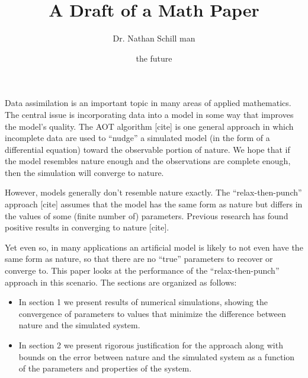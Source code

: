 \documentclass[12pt]{article}
\title{A Draft of a Math Paper}
\author{Dr. Nathan Schill man}
\date{the future}
\begin{document}
\maketitle

Data assimilation is an important topic in many areas of applied mathematics.
The central issue is incorporating data into a model in some way that improves the model's quality.
The AOT algorithm [cite] is one general approach in which incomplete data are used to ``nudge'' a simulated model (in the form of a differential equation) toward the observable portion of nature.
We hope that if the model resembles nature enough and the observations are complete enough, then the simulation will converge to nature.

However, models generally don't resemble nature exactly.
The ``relax-then-punch'' approach [cite] assumes that the model has the same form as nature but differs in the values of some (finite number of) parameters.
Previous research has found positive results in converging to nature [cite].

Yet even so, in many applications an artificial model is likely to not even have the same form as nature, so that there are no ``true'' parameters to recover or converge to.
This paper looks at the performance of the ``relax-then-punch'' approach in this scenario.
The sections are organized as follows:
\begin{itemize}
    \item In section 1 we present results of numerical simulations, showing the convergence of parameters to values that minimize the difference between nature and the simulated system.
    \item In section 2 we present rigorous justification for the approach along with bounds on the error between nature and the simulated system as a function of the parameters and properties of the system.
\end{itemize}
\end{document}

